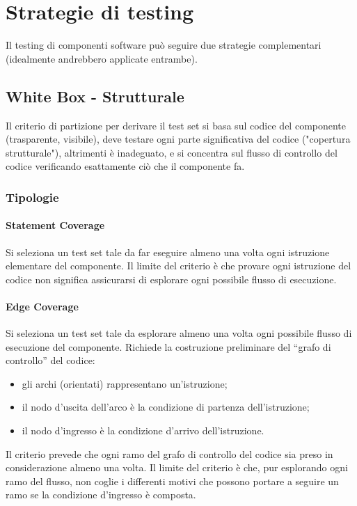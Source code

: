 \newpage

\section{Strategie di testing}

Il testing di componenti software può seguire due strategie complementari (idealmente andrebbero applicate entrambe).

\subsection{White Box - Strutturale}

Il criterio di partizione per derivare il test set si basa sul codice del componente (trasparente, visibile), deve testare ogni parte significativa del codice ("copertura strutturale"), altrimenti è inadeguato, e si concentra sul flusso di controllo del codice verificando esattamente ciò che il componente fa.

\subsubsection{Tipologie}

\paragraph{Statement Coverage} Si seleziona un test set tale da far eseguire almeno una volta ogni istruzione elementare del componente. Il limite del criterio è che provare ogni istruzione del codice non significa assicurarsi di esplorare ogni possibile flusso di esecuzione.
   
\paragraph{Edge Coverage} Si seleziona un test set tale da esplorare almeno una volta ogni possibile flusso di esecuzione del componente. Richiede la costruzione preliminare del “grafo di controllo” del codice: 
\begin{itemize}
       \item gli archi (orientati) rappresentano un'istruzione; 
       \item il nodo d'uscita dell'arco è la condizione di partenza dell'istruzione;
       \item il nodo d'ingresso è la condizione d'arrivo dell'istruzione. 
\end{itemize}
Il criterio prevede che ogni ramo del grafo di controllo del codice sia preso in considerazione almeno una volta. Il limite del criterio è che, pur esplorando ogni ramo del flusso, non coglie i differenti motivi che possono portare a seguire un ramo se la condizione d'ingresso è composta.
   
